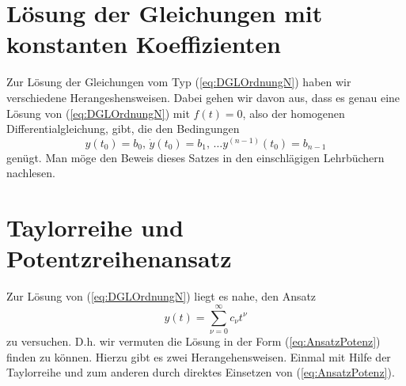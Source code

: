 \section{Lösung der Gleichungen mit konstanten Koeffizienten}
Zur Lösung der Gleichungen vom Typ (\ref{eq:DGLOrdnungN}) haben wir
verschiedene Herangeshensweisen. Dabei gehen wir davon aus, dass es genau eine
Lösung von (\ref{eq:DGLOrdnungN}) mit $f(t)=0$, also der homogenen
Differentialgleichung, gibt, die den Bedingungen 
\begin{equation}
y(t_0)=b_0,\,\dot{y}(t_0)=b_1,\,\dots y^{(n-1)}(t_0)=b_{n-1}
  \label{eq:ICsGDGL}
\end{equation}
genügt. Man möge den Beweis dieses Satzes in den einschlägigen Lehrbüchern
nachlesen.
\section{Taylorreihe und  Potentzreihenansatz}
Zur Lösung von (\ref{eq:DGLOrdnungN}) liegt es nahe, den Ansatz
\begin{equation}
  y(t)=\sum\limits_{\nu=0}^{\infty}c_\nu t^\nu
  \label{eq:AnsatzPotenz}
\end{equation}
zu versuchen. D.h. wir vermuten die Lösung in der Form (\ref{eq:AnsatzPotenz})
finden zu können. Hierzu gibt es zwei Herangehensweisen. Einmal mit Hilfe der
Taylorreihe und zum anderen durch direktes Einsetzen von
(\ref{eq:AnsatzPotenz}). 

